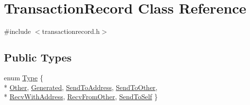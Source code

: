\hypertarget{class_transaction_record}{}\section{Transaction\+Record Class Reference}
\label{class_transaction_record}


{\ttfamily \#include $<$transactionrecord.\+h$>$}

\subsection*{Public Types}
\begin{DoxyCompactItemize}
\item 
enum \hyperlink{class_transaction_record_afb76f5876fba21c3d2c388b98a35d685}{Type} \{ \\*
\hyperlink{class_transaction_record_afb76f5876fba21c3d2c388b98a35d685aecbcb11ffbb16d3853676e3ce12c12df}{Other}, 
\hyperlink{class_transaction_record_afb76f5876fba21c3d2c388b98a35d685ab15d09d5069ce2dd728812d7ddfbdc7b}{Generated}, 
\hyperlink{class_transaction_record_afb76f5876fba21c3d2c388b98a35d685a92ce91a965ee8cd1c3ca60fe415b0eb0}{Send\+To\+Address}, 
\hyperlink{class_transaction_record_afb76f5876fba21c3d2c388b98a35d685a6bcc2354c3ab1fcaaeb8c1aab51dc889}{Send\+To\+Other}, 
\\*
\hyperlink{class_transaction_record_afb76f5876fba21c3d2c388b98a35d685ab0bb06b109e1fa70877d42a1c22f709f}{Recv\+With\+Address}, 
\hyperlink{class_transaction_record_afb76f5876fba21c3d2c388b98a35d685af952e16195e2dad5c132b3d77856ea05}{Recv\+From\+Other}, 
\hyperlink{class_transaction_record_afb76f5876fba21c3d2c388b98a35d685abbd291cccd8b7d4c1dadfbd69db12c6d}{Send\+To\+Self}
 \}
\end{DoxyCompactItemize}
